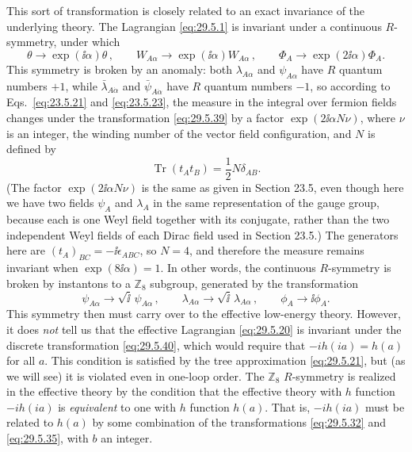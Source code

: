 This sort of transformation is closely related to an exact invariance of the
underlying theory. The Lagrangian \eqref{eq:29.5.1} is invariant under a
continuous \(R\)-symmetry, under which
\begin{equation}
  \theta\longrightarrow\exp(\ii\alpha)\theta\,,
  \qquad
  W_{A\alpha}\longrightarrow\exp(\ii\alpha)W_{A\alpha}\,,
  \qquad
  \Phi_A\longrightarrow\exp(2\ii\alpha)\Phi_A.
  \tag{29.5.39}\label{eq:29.5.39}
\end{equation}
This symmetry is broken by an anomaly: both \(\lambda_{A\alpha}\) and
\(\psi_{A\alpha}\) have \(R\) quantum numbers \(+1\), while
\(\bar\lambda_{A\dot\alpha}\) and \(\bar\psi_{A\dot\alpha}\) have
\(R\) quantum numbers \(-1\), so
according to Eqs.~\eqref{eq:23.5.21} and \eqref{eq:23.5.23}, the measure in
the integral over fermion fields changes under the transformation
\eqref{eq:29.5.39} by a factor \(\exp(2\ii\alpha N\nu)\), where \(\nu\) is an
integer, the winding number of the vector field configuration, and \(N\) is
defined by
\[
  \operatorname{Tr}(t_At_B)=\frac12N\delta_{AB}.
\]
(The factor \(\exp(2\ii\alpha N\nu)\) is the same as given in Section 23.5,
even though here we have two fields \(\psi_A\) and \(\lambda_A\) in the same
representation of the gauge group, because each is one Weyl field together
with its conjugate, rather than the two independent Weyl fields of each
Dirac field used in Section 23.5.) The generators here
are \((t_A)_{BC}=-\ii\epsilon_{ABC}\), so \(N=4\), and therefore the measure
remains invariant when \(\exp(8\ii\alpha)=1\). In other words, the continuous
\(R\)-symmetry is broken by instantons to a \(\mathbb{Z}_8\) subgroup,
generated by the transformation
\begin{equation}
  \psi_{A\alpha}\longrightarrow\sqrt{\ii}\,\psi_{A\alpha}\,,
  \qquad
  \lambda_{A\alpha}\longrightarrow\sqrt{\ii}\,\lambda_{A\alpha}\,,
  \qquad
  \phi_A\longrightarrow \ii\phi_A.
  \tag{29.5.40}\label{eq:29.5.40}
\end{equation}
This symmetry then must carry over to the effective low-energy theory.
However, it does \textit{not} tell us that the effective Lagrangian
\eqref{eq:29.5.20} is invariant under the discrete transformation
\eqref{eq:29.5.40}, which would require that \(-ih(ia)=h(a)\) for all
\(a\). This condition is satisfied by the tree approximation
\eqref{eq:29.5.21}, but (as we will see) it is violated even in one-loop
order. The \(\mathbb{Z}_8\) \(R\)-symmetry is realized in the effective
theory by the condition that the effective theory with \(h\) function
\(-ih(ia)\) is \textit{equivalent} to one with \(h\) function \(h(a)\).
That is, \(-ih(ia)\) must be related to \(h(a)\) by some combination of the
transformations \eqref{eq:29.5.32} and \eqref{eq:29.5.35}, with \(b\) an
integer.

